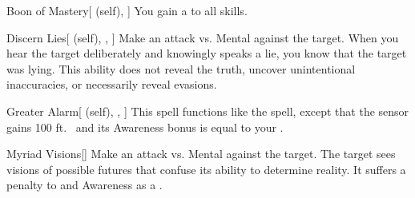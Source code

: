 \lowercase{\hypertarget{spell:Boon of Mastery}{}}\label{spell:Boon of Mastery}
\begin{attuneability}[Rank 3]{\hypertarget{spell:Boon of Mastery}{Boon of Mastery}}[ (self), ]
You gain a   to all skills.
\end{attuneability}
\vspace{0.25em}



\lowercase{\hypertarget{spell:Discern Lies}{}}\label{spell:Discern Lies}
\begin{attuneability}[Rank 3]{\hypertarget{spell:Discern Lies}{Discern Lies}}[ (self), , ]
Make an attack vs. Mental against the target.
\hit When you hear the target deliberately and knowingly speaks a lie, you know that the target was lying.
This ability does not reveal the truth, uncover unintentional inaccuracies, or necessarily reveal evasions.
\end{attuneability}
\vspace{0.25em}



\lowercase{\hypertarget{spell:Greater Alarm}{}}\label{spell:Greater Alarm}
\begin{attuneability}[Rank 3]{\hypertarget{spell:Greater Alarm}{Greater Alarm}}[ (self), , ]
This spell functions like the  spell, except that the sensor gains 100 ft.\  and its Awareness bonus is equal to your .
\end{attuneability}
\vspace{0.25em}



\lowercase{\hypertarget{spell:Myriad Visions}{}}\label{spell:Myriad Visions}
\begin{freeability}[Rank 3]{\hypertarget{spell:Myriad Visions}{Myriad Visions}}[]
Make an attack vs. Mental against the target.
\hit The target sees visions of possible futures that confuse its ability to determine reality.
It suffers a  penalty to  and Awareness as a .
\end{freeability}
\vspace{0.25em}



